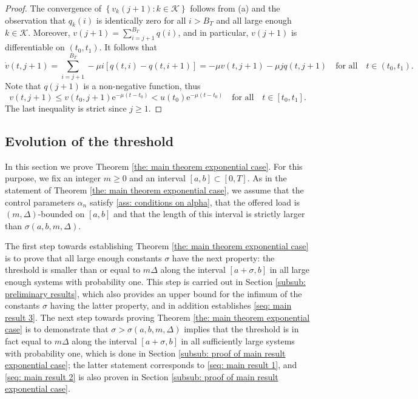 \documentclass[a4paper, 12pt]{article}
\theoremstyle{definition}
\newcommand{\set}[2]{\left\{#1 : #2\right\}}
\newcommand{\calK}{\mathcal{K}}
\newcommand{\e}{\mathrm{e}}
\begin{document}
\begin{proof}
The convergence of $\set{v_k(j + 1)}{k \in \calK}$ follows from (a) and the observation that $q_k(i)$ is identically zero for all $i > B_T$ and all large enough $k \in \calK$. Moreover, $v(j + 1) = \sum_{i = j + 1}^{B_T} q(i)$, and in particular, $v(j + 1)$ is differentiable on $(t_0, t_1)$. It follows that
\begin{equation*}
	\dot{v}(t, j + 1) = \sum_{i = j + 1}^{B_T} -\mu i \left[q(t, i) - q(t, i + 1)\right] = -\mu v(t, j + 1) - \mu j q(t, j + 1) \quad \text{for all} \quad t \in (t_0, t_1).
\end{equation*}
Note that $q(j + 1)$ is a non-negative function, thus
\begin{equation*}
	v(t, j + 1) \leq v(t_0, j + 1) \e^{-\mu(t - t_0)} < u(t_0) \e^{-\mu(t - t_0)} \quad \text{for all} \quad t \in [t_0, t_1].
\end{equation*}
The last inequality is strict since $j \geq 1$.
%
\end{proof}

\subsection{Evolution of the threshold}
\label{sub: evolution of the threshold}

In this section we prove Theorem \ref{the: main theorem exponential case}. For this purpose, we fix an integer $m \geq 0$ and an interval $[a, b] \subset [0, T]$. As in the statement of Theorem \ref{the: main theorem exponential case}, we assume that the control parameters $\alpha_n$ satisfy \eqref{ass: conditions on alpha}, that the offered load is $(m, \Delta)$-bounded on $[a, b]$ and that the length of this interval is strictly larger than $\sigma(a, b, m, \Delta)$.

The first step towards establishing Theorem \ref{the: main theorem exponential case} is to prove that all large enough constants $\sigma$ have the next property: the threshold is smaller than or equal to $m \Delta$ along the interval $[a + \sigma, b]$ in all large enough systems with probability one. This step is carried out in Section \ref{subsub: preliminary results}, which also provides an upper bound for the infimum of the constants $\sigma$ having the latter property, and in addition establishes \eqref{seq: main result 3}. The next step towards proving Theorem \ref{the: main theorem exponential case} is to demonstrate that $\sigma > \sigma(a, b, m , \Delta)$ implies that the threshold is in fact equal to $m \Delta$ along the interval $[a + \sigma, b]$ in all sufficiently large systems with probability one, which is done in Section \ref{subsub: proof of main result exponential case}; the latter statement corresponds to \eqref{seq: main result 1}, and \eqref{seq: main result 2} is also proven in Section \ref{subsub: proof of main result exponential case}.
\end{document}
